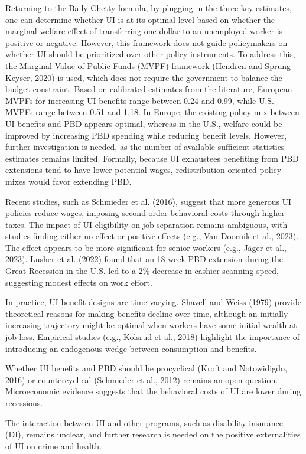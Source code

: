 \documentclass{article}
\begin{document}
Returning to the Baily-Chetty formula, by plugging in the three key estimates, one can determine whether UI is at its optimal level based on whether the marginal welfare effect of transferring one dollar to an unemployed worker is positive or negative. However, this framework does not guide policymakers on whether UI should be prioritized over other policy instruments. To address this, the Marginal Value of Public Funds (MVPF) framework (Hendren and Sprung-Keyser, 2020) is used, which does not require the government to balance the budget constraint. Based on calibrated estimates from the literature, European MVPFs for increasing UI benefits range between 0.24 and 0.99, while U.S. MVPFs range between 0.51 and 1.18. In Europe, the existing policy mix between UI benefits and PBD appears optimal, whereas in the U.S., welfare could be improved by increasing PBD spending while reducing benefit levels. However, further investigation is needed, as the number of available sufficient statistics estimates remains limited. Formally, because UI exhaustees benefiting from PBD extensions tend to have lower potential wages, redistribution-oriented policy mixes would favor extending PBD.

Recent studies, such as Schmieder et al. (2016), suggest that more generous UI policies reduce wages, imposing second-order behavioral costs through higher taxes. The impact of UI eligibility on job separation remains ambiguous, with studies finding either no effect or positive effects (e.g., Van Doornik et al., 2023). The effect appears to be more significant for senior workers (e.g., Jäger et al., 2023). Lusher et al. (2022) found that an 18-week PBD extension during the Great Recession in the U.S. led to a 2\% decrease in cashier scanning speed, suggesting modest effects on work effort.

In practice, UI benefit designs are time-varying. Shavell and Weiss (1979) provide theoretical reasons for making benefits decline over time, although an initially increasing trajectory might be optimal when workers have some initial wealth at job loss. Empirical studies (e.g., Kolsrud et al., 2018) highlight the importance of introducing an endogenous wedge between consumption and benefits.

Whether UI benefits and PBD should be procyclical (Kroft and Notowidigdo, 2016) or countercyclical (Schmieder et al., 2012) remains an open question. Microeconomic evidence suggests that the behavioral costs of UI are lower during recessions.

The interaction between UI and other programs, such as disability insurance (DI), remains unclear, and further research is needed on the positive externalities of UI on crime and health.
\end{document}
